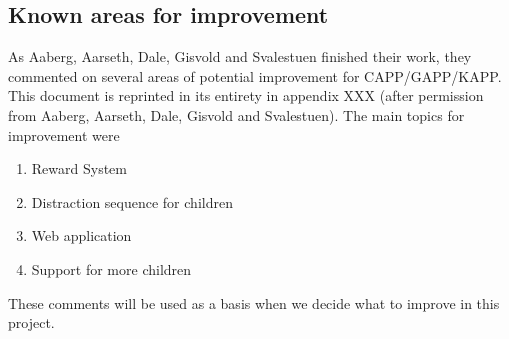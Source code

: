 \subsection{Known areas for improvement}
As Aaberg, Aarseth, Dale, Gisvold and Svalestuen finished their work, they commented on several areas of potential improvement for CAPP/GAPP/KAPP. This document is reprinted in its entirety in appendix XXX (after permission from Aaberg, Aarseth, Dale, Gisvold and Svalestuen). The main topics for improvement were
\begin{enumerate}
\item{Reward System}
\item{Distraction sequence for children}
\item{Web application}
\item{Support for more children}
\end{enumerate}

These comments will be used as a basis when we decide what to improve in this project.




